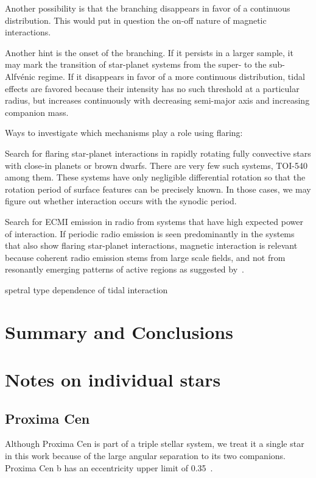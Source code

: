 \documentclass[twocolumn]{aastex631}
\begin{document}
Another possibility is that the branching disappears in favor of a continuous distribution. This would put in question the on-off nature of magnetic interactions.

Another hint is the onset of the branching. If it persists in a larger sample, it may mark the transition of star-planet systems from the super- to the sub-Alfv\'enic regime. If it disappears in favor of a more continuous distribution, tidal effects are favored because their intensity has no such threshold at a particular radius, but increases continuously with decreasing semi-major axis and increasing companion mass.



Ways to investigate which mechanisms play a role using flaring:

Search for flaring star-planet interactions in rapidly rotating fully convective stars with close-in planets or brown dwarfs. There are very few such systems, TOI-540 among them. These systems have only negligible differential rotation so that the rotation period of surface features can be precisely known. In those cases, we may figure out whether interaction occurs with the synodic period.

Search for ECMI emission in radio from systems that have high expected power of interaction. If periodic radio emission is seen predominantly in the systems that also show flaring star-planet interactions, magnetic interaction is relevant because coherent radio emission stems from large scale fields, and not from resonantly emerging patterns of active regions as suggested by~\citet{lanza2022model}.

spetral type dependence of tidal interaction

\section{Summary and Conclusions}
\label{sec:summary}



\appendix
\section{Notes on individual stars}
\subsection{Proxima Cen}
Although Proxima Cen is part of a triple stellar system, we treat it a single star in this work because of the large angular separation to its two companions. Proxima Cen b has an eccentricity upper limit of 0.35~\cite{anglada-escude2016terrestrial}.
\end{document}
